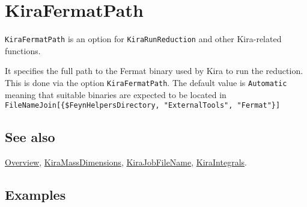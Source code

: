 \documentclass[../FeynHelpersManual.tex]{subfiles}
\begin{document}
\begin{Shaded}
\begin{Highlighting}[]
 
\end{Highlighting}
\end{Shaded}

\hypertarget{kirafermatpath}{
\section{KiraFermatPath}\label{kirafermatpath}}

\texttt{KiraFermatPath} is an option for \texttt{KiraRunReduction} and
other Kira-related functions.

It specifies the full path to the Fermat binary used by Kira to run the
reduction. This is done via the option \texttt{KiraFermatPath}. The
default value is \texttt{Automatic} meaning that suitable binaries are
expected to be located in
\texttt{FileNameJoin[\allowbreak{}\{\allowbreak{}\$FeynHelpersDirectory,\ \allowbreak{}"ExternalTools",\ \allowbreak{}"Fermat"\}]}

\subsection{See also}

\hyperlink{toc}{Overview},
\hyperlink{kiramassdimensions}{KiraMassDimensions},
\hyperlink{kirajobfilename}{KiraJobFileName},
\hyperlink{kiraintegrals}{KiraIntegrals}.

\subsection{Examples}
\end{document}
